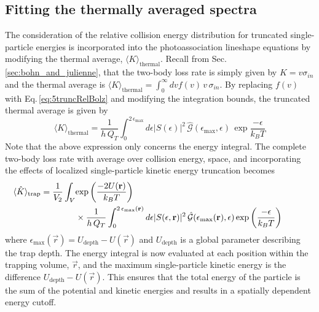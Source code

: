 \subsection{Fitting the thermally averaged spectra} \label{sec:lowIntSpectra}

The consideration of the relative collision energy distribution for truncated single-particle energies is incorporated into the photoassociation lineshape equations by modifying the thermal average, $\langle K \rangle_\text{thermal}$.
Recall from Sec.\,\ref{sec:bohn_and_julienne}, that the two-body loss rate is simply given by $K= v \sigma_{in}$ and the thermal average is $\langle K \rangle_{\text{thermal}} = \displaystyle \int_0^{\infty} dv f(v)\,v\,\sigma_{in}$.
By replacing $f(v)$ with Eq.\,\ref{eq:5truncRelBolz} and modifying the integration bounds, the truncated thermal average is given by
\begin{equation}
	\langle K \rangle_\text{thermal} = \frac{1}{h\,Q_{T}} \int_{0}^{2\,\epsilon_{\text{max}}} d\epsilon \vert S(\epsilon) \vert^2 \, \hat{\mathcal{G}}(\epsilon_\text{max}, \epsilon)\,\exp{\frac{-\epsilon}{k_{B}T}}
\end{equation}
Note that the above expression only concerns the energy integral.
The complete two-body loss rate with average over collision energy, space, and incorporating the effects of localized single-particle kinetic energy truncation becomes
\begin{align} \label{eq:chap5avgTruncK}
\hspace*{-1cm} 
	\langle \hat{K} \rangle_\text{trap} = \frac{1}{V_2} \int_V &\exp{\frac{-2 U(\vec{r})}{k_{B}T}} \\ 
	\nonumber
	&\times \frac{1}{h\,Q_{T}} \int_{0}^{2\,\epsilon_{\text{max}}(\vec{r})} d\epsilon \vert S(\epsilon, \vec{r}) \vert^2 \,\hat{\mathcal{G}} ( \epsilon_\text{max}(\vec{r}), \epsilon)  \,\exp{\frac{-\epsilon}{k_{B}T}}
\end{align}
where $\epsilon_\text{max}(\vec{r}) = U_\text{depth}-U(\vec{r})$ and $U_\text{depth}$ is a global parameter describing the trap depth.
The energy integral is now evaluated at each position within the trapping volume, $\vec{r}$, and the maximum single-particle kinetic energy is the difference $U_{\text{depth}} - U(\vec{r})$.
This ensures that the total energy of the particle is the sum of the potential and kinetic energies and results in a spatially dependent energy cutoff.

